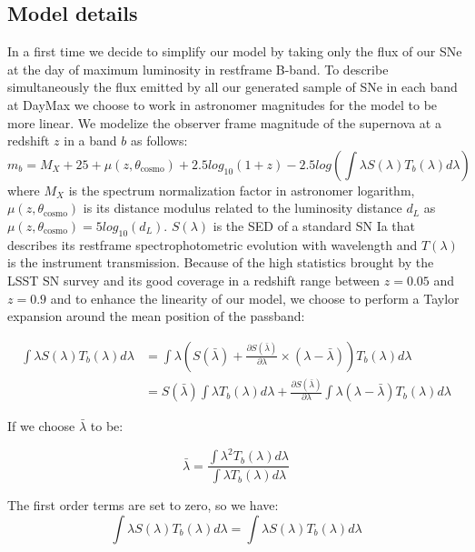 \documentclass[\docopts]{\docclass}
\begin{document}
\subsection{Model details}
\label{subsec::model_details}
In a first time we decide to simplify our model by taking only the flux of our SNe at the day of maximum luminosity in restframe B-band.
To describe simultaneously the flux emitted by all our generated sample of SNe in each band at DayMax we choose to work in astronomer magnitudes for the model to be more linear.
We modelize the observer frame magnitude of the supernova at a redshift $z$ in a band $b$ as follows:
\begin{equation}
\label{eq::raw_model}
 m_b = M_X + 25 + \mu(z, \theta_\text{cosmo}) + 2.5log_{10}(1+z) - 2.5log(\int \lambda S(\lambda) T_b(\lambda) d\lambda) 
\end{equation}
where $M_X$ is the spectrum normalization factor in astronomer logarithm, $\mu(z, \theta_\text{cosmo})$ is its distance modulus related to the luminosity distance $d_L$ as $\mu(z, \theta_\text{cosmo}) = 5log_{10}(d_L)$.
$S(\lambda)$ is the SED of a standard SN Ia that describes its restframe spectrophotometric evolution with wavelength and $T(\lambda)$ is the instrument transmission.
Because of the high statistics brought by the LSST SN survey and its good coverage in a redshift range between $z=0.05$ and $z=0.9$ and to enhance the linearity of our model, we choose to perform a Taylor expansion around the mean position of the passband:

\begin{equation}
\begin{split}
\int \lambda S(\lambda) T_b(\lambda) d\lambda &= \int \lambda \left(S(\bar\lambda)+\frac{\partial S(\bar\lambda)}{\partial \lambda} \times ( \lambda - \bar\lambda ) \right) T_b(\lambda) d\lambda \\
&= S(\bar\lambda) \int \lambda T_b(\lambda) d\lambda + \frac{\partial S(\bar \lambda)}{\partial\lambda} \int \lambda (\lambda - \bar\lambda) T_b(\lambda) d\lambda
\end{split}
\end{equation}

If we choose $\bar \lambda$ to be:

\begin{equation}
  \bar \lambda = \frac{\int \lambda^2 T_b(\lambda) d\lambda}{\int \lambda T_b(\lambda) d\lambda}
\end{equation}

The first order terms are set to zero, so we have:
\begin{equation}
\int \lambda S(\lambda) T_b(\lambda) d\lambda = \int \lambda S(\lambda) T_b(\lambda) d\lambda
\end{equation}
\end{document}
